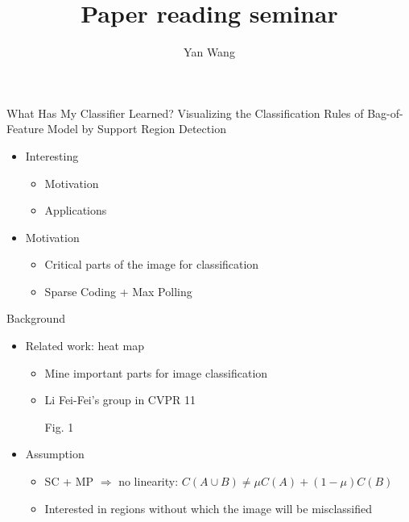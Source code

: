 \documentclass[12pt]{beamer}
\author{Yan Wang}
\title{Paper reading seminar}
\subtitle{}
\begin{document}
\begin{frame}[plain]
	\titlepage
\end{frame}

\begin{frame}{What Has My Classifier Learned? Visualizing the Classification Rules of Bag-of-Feature Model by Support Region Detection}
    \begin{itemize}
        \item Interesting
        \begin{itemize}
            \item Motivation
            \item Applications
        \end{itemize}
        \item Motivation
        \begin{itemize}
            \item Critical parts of the image for classification
            \item Sparse Coding + Max Polling
        \end{itemize}
    \end{itemize}
\end{frame}

\begin{frame}{Background}
    \begin{itemize}
        \item Related work: heat map
        \begin{itemize}
            \item Mine important parts for image classification
            \item Li Fei-Fei's group in CVPR 11
            \item [Fig. 1]
        \end{itemize}
        \item Assumption
        \begin{itemize}
            \item SC + MP $\Rightarrow$ no linearity: $C(A \cup B) \neq \mu C(A) + (1 - \mu) C(B)$
            \item Interested in regions without which the image will be misclassified
        \end{itemize}
    \end{itemize}
\end{frame}
\end{document}
